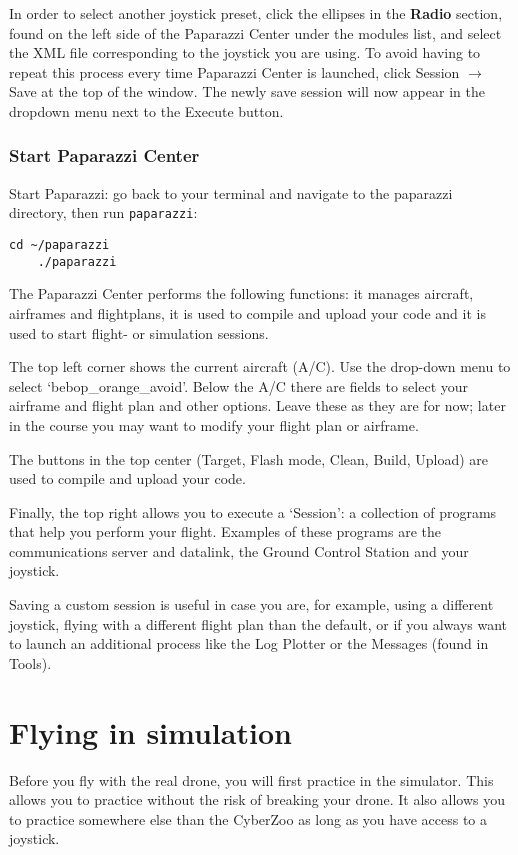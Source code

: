 In order to select another joystick preset, click the ellipses in the \textbf{Radio} section, found on the left side of the Paparazzi Center under the modules list, and select the XML file corresponding to the joystick you are using. To avoid having to repeat this process every time Paparazzi Center is launched, click Session $\to$  Save at the top of the window. The newly save session will now appear in the dropdown menu next to the Execute button.

\subsubsection*{Start Paparazzi Center}
Start Paparazzi: go back to your terminal and navigate to the paparazzi directory, then run \texttt{paparazzi}:

\begin{lstlisting}[style=Bash]
	cd ~/paparazzi
	./paparazzi
\end{lstlisting}

\medskip
The Paparazzi Center performs the following functions: it manages aircraft, airframes and flightplans, it is used to compile and upload your code and it is used to start flight- or simulation sessions.

The top left corner shows the current aircraft (A/C). Use the drop-down menu to select `bebop\_orange\_avoid'.
Below the A/C there are fields to select your airframe and flight plan and other options. Leave these as they are for now; later in the course you may want to modify your flight plan or airframe.

The buttons in the top center (Target, Flash mode, Clean, Build, Upload) are used to compile and upload your code.

Finally, the top right allows you to execute a `Session': a collection of programs that help you perform your flight. Examples of these programs are the communications server and datalink, the Ground Control Station and your joystick.

Saving a custom session is useful in case you are, for example, using a different joystick, flying with a different flight plan than the default, or if you always want to launch an additional process like the Log Plotter or the Messages (found in Tools).


\section{Flying in simulation}
Before you fly with the real drone, you will first practice in the simulator.
This allows you to practice without the risk of breaking your drone. It also allows you to practice somewhere else than the CyberZoo as long as you have access to a joystick.

